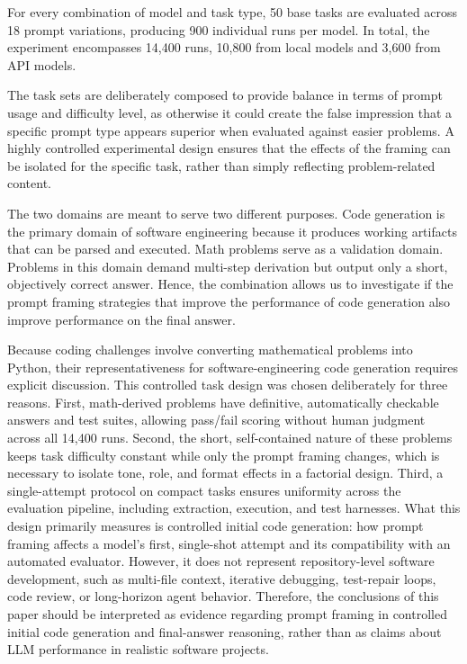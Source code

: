 \documentclass{llncs}
\begin{document}
For every combination of model and task type, 50 base tasks are evaluated across 18 prompt variations, producing 900 individual runs per model. In total, the experiment encompasses 14,400 runs, 10,800 from local models and 3,600 from API models.

The task sets are deliberately composed to provide balance in terms of prompt usage and difficulty level, as otherwise it could create the false impression that a specific prompt type appears superior when evaluated against easier problems. A highly controlled experimental design ensures that the effects of the framing can be isolated for the specific task, rather than simply reflecting problem-related content.

The two domains are meant to serve two different purposes. Code generation is the primary domain of software engineering because it produces working artifacts that can be parsed and executed. Math problems serve as a validation domain. Problems in this domain demand multi-step derivation but output only a short, objectively correct answer. Hence, the combination allows us to investigate if the prompt framing strategies that improve the performance of code generation also improve performance on the final answer.

Because coding challenges involve converting mathematical problems into Python, their representativeness for software-engineering code generation requires explicit discussion. This controlled task design was chosen deliberately for three reasons. First, math-derived problems have definitive, automatically checkable answers and test suites, allowing pass/fail scoring without human judgment across all 14,400 runs. Second, the short, self-contained nature of these problems keeps task difficulty constant while only the prompt framing changes, which is necessary to isolate tone, role, and format effects in a factorial design. Third, a single-attempt protocol on compact tasks ensures uniformity across the evaluation pipeline, including extraction, execution, and test harnesses. What this design primarily measures is controlled initial code generation: how prompt framing affects a model's first, single-shot attempt and its compatibility with an automated evaluator. However, it does not represent repository-level software development, such as multi-file context, iterative debugging, test-repair loops, code review, or long-horizon agent behavior. Therefore, the conclusions of this paper should be interpreted as evidence regarding prompt framing in controlled initial code generation and final-answer reasoning, rather than as claims about LLM performance in realistic software projects.
\end{document}
